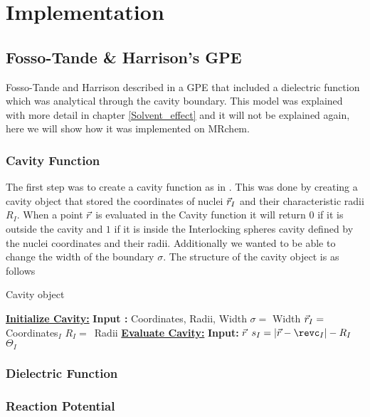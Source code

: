 \documentclass[../master_thesis.tex]{subfiles}
\begin{document}
\chapter{Implementation}\label{chap:implementation}
\section{Fosso-Tande \& Harrison's \ac{GPE}}
Fosso-Tande and Harrison described in \cite{FossoTande:2013ka} a \ac{GPE} that
included a dielectric function which was analytical through the cavity boundary.
This model was explained with more detail in chapter \ref{Solvent_effect} and
it will not be explained again, here we will show how it was implemented on
MRchem.
\subsection{Cavity Function}
The first step was to create a cavity function as in \cite{FossoTande:2013ka}.
This was done by creating a cavity object that stored the coordinates of nuclei
$\vec{r}_I$ and their characteristic radii $R_I$. When a point $\vec{r}$ is evaluated
in the Cavity function it will return $0$ if it is outside the cavity and $1$ if
it is inside the Interlocking spheres cavity defined by the nuclei coordinates
and their radii. Additionally we wanted to be able to change the width of the
boundary $\sigma$. The structure of the cavity object is as follows

\begin{algorithm}
  \caption{Cavity object}
  \begin{algorithmic}
    \STATE \underline{\textbf{Initialize Cavity:}}
    \STATE \textbf{Input :} Coordinates, Radii, Width
    \STATE $\sigma = $ Width
     \STATE$\vec{r}_I = $ Coordinates$_I$
     \STATE$R_I = $ Radii
    \ENDFOR
    \STATE
    \STATE \underline{\textbf{Evaluate Cavity:}}
    \STATE \textbf{Input: } $\vec{r}$
      \STATE $s_I = \abs{\rvec - \revc_I} - R_I$
      \STATE $\Theta_I$
    \ENDFOR
  \end{algorithmic}
\end{algorithm}


\subsection{Dielectric Function}
\subsection{Reaction Potential}
\end{document}
